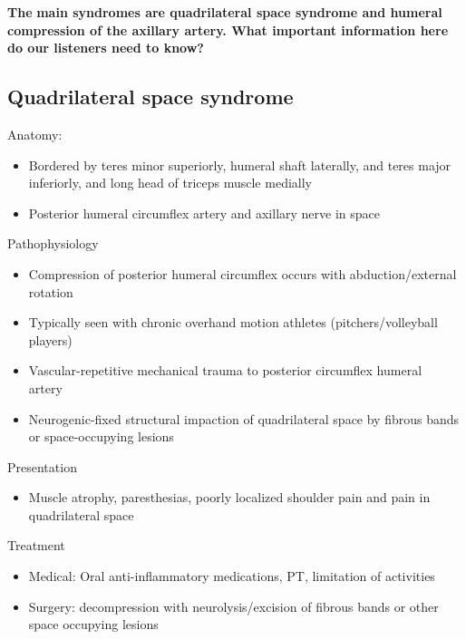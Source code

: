 \documentclass[
]{book}
\providecommand{\tightlist}{%
  \setlength{\itemsep}{0pt}\setlength{\parskip}{0pt}}
\begin{document}
\textbf{The} \textbf{main syndromes are quadrilateral space syndrome and humeral
compression of the axillary artery. What important information here do
our listeners need to know?}

\hypertarget{quadrilateral-space-syndrome}{%
\subsection{Quadrilateral space syndrome}\label{quadrilateral-space-syndrome}}

Anatomy:

\begin{itemize}
\item
  Bordered by teres minor superiorly, humeral shaft laterally, and
  teres major inferiorly, and long head of triceps muscle medially
\item
  Posterior humeral circumflex artery and axillary nerve in space
\end{itemize}

Pathophysiology

\begin{itemize}
\item
  Compression of posterior humeral circumflex occurs with
  abduction/external rotation~
\item
  Typically seen with chronic overhand motion athletes
  (pitchers/volleyball players)
\item
  Vascular-repetitive mechanical trauma to posterior circumflex
  humeral artery~
\item
  Neurogenic-fixed structural impaction of quadrilateral space by
  fibrous bands or space-occupying lesions
\end{itemize}

Presentation

\begin{itemize}
\tightlist
\item
  Muscle atrophy, paresthesias, poorly localized shoulder pain and
  pain in quadrilateral space
\end{itemize}

Treatment

\begin{itemize}
\item
  Medical: Oral anti-inflammatory medications, PT, limitation of
  activities
\item
  Surgery: decompression with neurolysis/excision of fibrous bands or
  other space occupying lesions~
\end{itemize}
\end{document}
